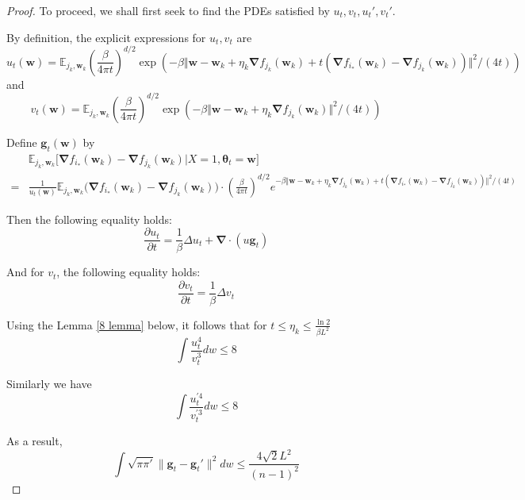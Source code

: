 \documentclass[final,12pt]{colt2018} %
\begin{document}
\begin{proof}
To proceed, we shall first seek to find the PDEs satisfied by $u_t,v_t,u_t',v_t'$.


By definition, the explicit expressions for $u_t,v_t$ are
\begin{equation}
  u_t(\bm{w})=\mathbb{E}_{j_k,\bm{w}_k} \left(\frac{\beta}{4\pi t}\right)^{d/2}\exp(-\beta\Vert\bm{w}-\bm{w}_k+\eta_k\bm{\nabla}f_{j_k}(\bm{w}_k)+t(\bm{\nabla} f_{i_*}(\bm{w}_k)-\bm{\nabla} f_{j_k}(\bm{w}_k))\Vert^2/(4 t))
\end{equation}
and
\begin{equation}
  v_t(\bm{w})=\mathbb{E}_{j_k,\bm{w}_k}\left(\frac{\beta}{4\pi t}\right)^{d/2}\exp(-\beta\Vert\bm{w}-\bm{w}_k+\eta_k\bm{\nabla}f_{j_k}(\bm{w}_k)\Vert^2/(4 t))
\end{equation}

Define $\bm{g}_t(\bm{w})$ by
\begin{equation}
\begin{split}
  &\mathbb{E}_{j_k,\bm{w}_k}\Big[\bm{\nabla} f_{i_*}(\bm{w}_k)-\bm{\nabla} f_{j_k}(\bm{w}_k)\Big|X=1,\bm{\theta}_t=\bm{w}\Big]\\
  =&\frac{1}{u_t(\bm{w})}\mathbb{E}_{j_k,\bm{w}_k} \Big(\bm{\nabla} f_{i_*}(\bm{w}_k)-\bm{\nabla} f_{j_k}(\bm{w}_k)\Big)\cdot\left(\frac{\beta}{4\pi t}\right)^{d/2}e^{-\beta\Vert\bm{w}-\bm{w}_k+\eta_k\bm{\nabla}f_{j_k}(\bm{w}_k)+t(\bm{\nabla} f_{i_*}(\bm{w}_k)-\bm{\nabla} f_{j_k}(\bm{w}_k))\Vert^2/(4 t)}
\end{split}
\end{equation}

Then the following equality holds:
\begin{equation}
  \frac{\partial u_t}{\partial t}= \frac{1}{\beta}\Delta u_t+\bm{\nabla}\cdot(u \bm{g}_t)
\end{equation}

And for $v_t$, the following equality holds:
\begin{equation}
  \frac{\partial v_t}{\partial t}= \frac{1}{\beta}\Delta v_t
\end{equation}

Using the Lemma \ref{8 lemma} below, it follows that for $t\le \eta_k\le \frac{\ln 2}{\beta L^2}$
\begin{equation}
  \int\frac{u_{t}^4}{v_{t}^3}dw\le 8
\end{equation}

Similarly we have
\begin{equation}
  \int \frac{u_t^{\prime 4}}{v_t^{\prime 3}}dw\le 8
\end{equation}

As a result,
\begin{equation}
  \int \sqrt{\pi \pi'}\|\bm{g}_t-\bm{g}_t'\|^2dw\le \frac{4\sqrt{2}L^2}{(n-1)^2}
\end{equation}
\end{proof}
\end{document}

